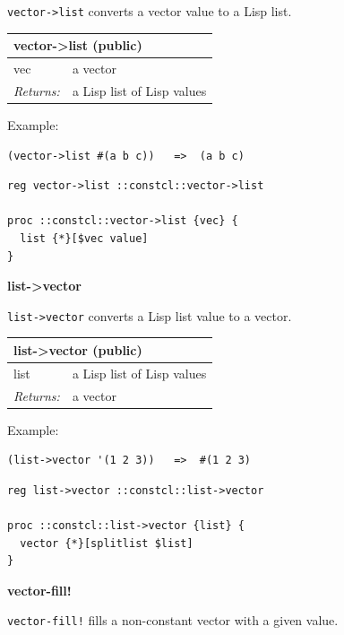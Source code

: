 \documentclass[twoside,9pt]{report}
\begin{document}
\texttt{vector->list} converts a vector value to a Lisp list.

\begin{tabular}{ |l l| }
\hline
\multicolumn{2}{|l|}{vector->list (public)} \\
\hline
vec & a vector \\
\textit{Returns:} & a Lisp list of Lisp values \\
\hline
\end{tabular}


Example:

\noindent\makebox[\linewidth]{\rule{\linewidth}{0.4pt}}
\begin{lstlisting}
(vector->list #(a b c))   =>  (a b c)
\end{lstlisting}
\noindent\makebox[\linewidth]{\rule{\linewidth}{0.4pt}}
\noindent\makebox[\linewidth]{\rule{\linewidth}{0.4pt}}
\begin{lstlisting}
reg vector->list ::constcl::vector->list
 
proc ::constcl::vector->list {vec} {
  list {*}[$vec value]
}
\end{lstlisting}
\noindent\makebox[\linewidth]{\rule{\linewidth}{0.4pt}}

\textbf{list->vector}


\texttt{list->vector} converts a Lisp list value to a vector.

\begin{tabular}{ |l l| }
\hline
\multicolumn{2}{|l|}{list->vector (public)} \\
\hline
list & a Lisp list of Lisp values \\
\textit{Returns:} & a vector \\
\hline
\end{tabular}


Example:

\noindent\makebox[\linewidth]{\rule{\linewidth}{0.4pt}}
\begin{lstlisting}
(list->vector '(1 2 3))   =>  #(1 2 3)
\end{lstlisting}
\noindent\makebox[\linewidth]{\rule{\linewidth}{0.4pt}}
\noindent\makebox[\linewidth]{\rule{\linewidth}{0.4pt}}
\begin{lstlisting}
reg list->vector ::constcl::list->vector
 
proc ::constcl::list->vector {list} {
  vector {*}[splitlist $list]
}
\end{lstlisting}
\noindent\makebox[\linewidth]{\rule{\linewidth}{0.4pt}}

\textbf{vector-fill!}


\texttt{vector-fill!} fills a non-constant vector with a given value.
\end{document}
